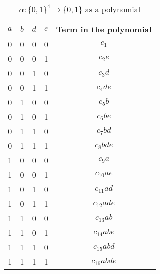 \begin{table}[t]
	\centering
	\begin{tabular}{|c c c c c|}
		\hline 
		$a$ & $b$ & $d$ & $e$ & Term in the polynomial \\
		\hline
		0 & 0 & 0 & 0 & $c_1$        \\
		0 & 0 & 0 & 1 & $c_2e$       \\
		0 & 0 & 1 & 0 & $c_3d$       \\
		0 & 0 & 1 & 1 & $c_4de$      \\
		0 & 1 & 0 & 0 & $c_5b$       \\
		0 & 1 & 0 & 1 & $c_6be$      \\
		0 & 1 & 1 & 0 & $c_7bd$      \\
		0 & 1 & 1 & 1 & $c_8bde$     \\
		1 & 0 & 0 & 0 & $c_9a$       \\
		1 & 0 & 0 & 1 & $c_{10}ae$   \\
		1 & 0 & 1 & 0 & $c_{11}ad$   \\
		1 & 0 & 1 & 1 & $c_{12}ade$  \\
		1 & 1 & 0 & 0 & $c_{13}ab$   \\
		1 & 1 & 0 & 1 & $c_{14}abe$  \\
		1 & 1 & 1 & 0 & $c_{15}abd$  \\
		1 & 1 & 1 & 1 & $c_{16}abde$ \\
		\hline
	\end{tabular}
	\caption{$\alpha:\{0,1\}^4\to\{0,1\}$ as a polynomial}
	\label{tab:polynomial}
\end{table}